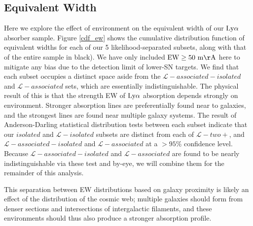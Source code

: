 \documentclass[twocolumn,tighten]{aastex62}
\begin{document}
\subsection{Equivalent Width}


Here we explore the effect of environment on the equivalent width of our $\rm Ly\alpha$ absorber sample. Figure \ref{cdf_ew} shows the cumulative distribution function of equivalent widths for each of our 5 likelihood-separated subsets, along with that of the entire sample in black). We have only included $\rm EW \ge 50~m\AA$ here to mitigate any bias due to the detection limit of lower-SN targets. We find that each subset occupies a distinct space aside from the $\mathcal{L}-associated-isolated$ and $\mathcal{L}-associated$ sets, which are essentially indistinguishable. The physical result of this is that the strength EW of $\rm Ly\alpha$ absorption depends strongly on environment. Stronger absorption lines are preferentially found near to galaxies, and the strongest lines are found near multiple galaxy systems. The result of Anderson-Darling statistical distribution tests between each subset indicate that our $isolated$ and $\mathcal{L}-isolated$ subsets are distinct from each of $\mathcal{L}-two+$, and $\mathcal{L}-associated-isolated$ and $\mathcal{L}-associated$ at a $>95\%$ confidence level. Because $\mathcal{L}-associated-isolated$ and $\mathcal{L}-associated$ are found to be nearly indistinguishable via these test and by-eye, we will combine them for the remainder of this analysis.


This separation between EW distributions based on galaxy proximity is likely an effect of the distribution of the cosmic web; multiple galaxies should form from denser sections and intersections of intergalactic filaments, and these environments should thus also produce a stronger absorption profile. 
\end{document}
